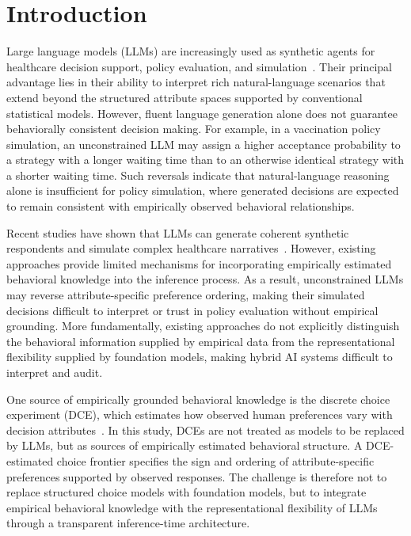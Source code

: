 \documentclass[11pt]{article}
\begin{document}
\clearpage
\section{Introduction}
\label{sec:intro}

Large language models (LLMs) are increasingly used as synthetic agents for healthcare decision support, policy evaluation, and simulation~\citep{Park2023a, Mu2024, VonHoene2025, Gupta2025b, Rybinski2024}. Their principal advantage lies in their ability to interpret rich natural-language scenarios that extend beyond the structured attribute spaces supported by conventional statistical models. However, fluent language generation alone does not guarantee behaviorally consistent decision making. For example, in a vaccination policy simulation, an unconstrained LLM may assign a higher acceptance probability to a strategy with a longer waiting time than to an otherwise identical strategy with a shorter waiting time. Such reversals indicate that natural-language reasoning alone is insufficient for policy simulation, where generated decisions are expected to remain consistent with empirically observed behavioral relationships.

Recent studies have shown that LLMs can generate coherent synthetic respondents and simulate complex healthcare narratives~\citep{Aher2022TuringExperiments, Horton2023, santurkar2023whose, Zelin2024b}. However, existing approaches provide limited mechanisms for incorporating empirically estimated behavioral knowledge into the inference process. As a result, unconstrained LLMs may reverse attribute-specific preference ordering, making their simulated decisions difficult to interpret or trust in policy evaluation without empirical grounding. More fundamentally, existing approaches do not explicitly distinguish the behavioral information supplied by empirical data from the representational flexibility supplied by foundation models, making hybrid AI systems difficult to interpret and audit.

One source of empirically grounded behavioral knowledge is the discrete choice experiment (DCE), which estimates how observed human preferences vary with decision attributes~\citep{Chan2024}. In this study, DCEs are not treated as models to be replaced by LLMs, but as sources of empirically estimated behavioral structure. A DCE-estimated choice frontier specifies the sign and ordering of attribute-specific preferences supported by observed responses. The challenge is therefore not to replace structured choice models with foundation models, but to integrate empirical behavioral knowledge with the representational flexibility of LLMs through a transparent inference-time architecture.
\end{document}
